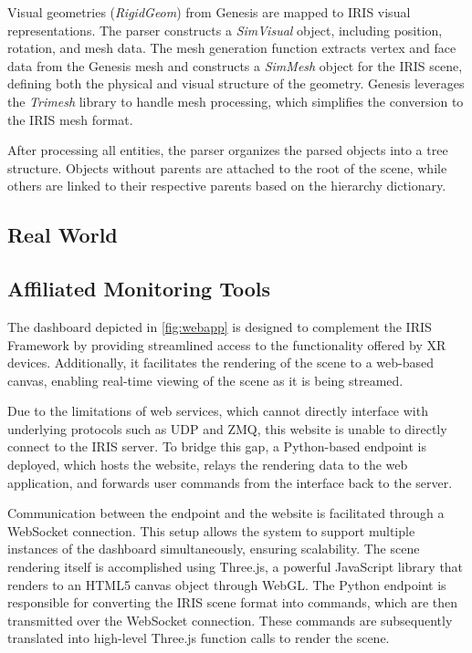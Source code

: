 Visual geometries (\textit{RigidGeom}) from Genesis are mapped to IRIS visual representations. The parser constructs a \textit{SimVisual} object, including position, rotation, and mesh data.
The mesh generation function extracts vertex and face data from the Genesis mesh and constructs a \textit{SimMesh} object for the IRIS scene, defining both the physical and visual structure of the geometry. Genesis leverages the \textit{Trimesh} \cite{trimeshTrimeshTrimesh} library to handle mesh processing, which simplifies the conversion to the IRIS mesh format.

After processing all entities, the parser organizes the parsed objects into a tree structure. Objects without parents are attached to the root of the scene, while others are linked to their respective parents based on the hierarchy dictionary.




\subsection{Real World}



\subsection{Affiliated Monitoring Tools}
The dashboard depicted in \ref{fig:webapp} is designed to complement the IRIS Framework by providing streamlined access to the functionality offered by XR devices. Additionally, it facilitates the rendering of the scene to a web-based canvas, enabling real-time viewing of the scene as it is being streamed.

Due to the limitations of web services, which cannot directly interface with underlying protocols such as UDP and ZMQ, this website is unable to directly connect to the IRIS server. To bridge this gap, a Python-based endpoint is deployed, which hosts the website, relays the rendering data to the web application, and forwards user commands from the interface back to the server.

Communication between the endpoint and the website is facilitated through a WebSocket connection. This setup allows the system to support multiple instances of the dashboard simultaneously, ensuring scalability. The scene rendering itself is accomplished using Three.js, a powerful JavaScript library that renders to an HTML5 canvas object through WebGL. The Python endpoint is responsible for converting the IRIS scene format into commands, which are then transmitted over the WebSocket connection. These commands are subsequently translated into high-level Three.js function calls to render the scene.

